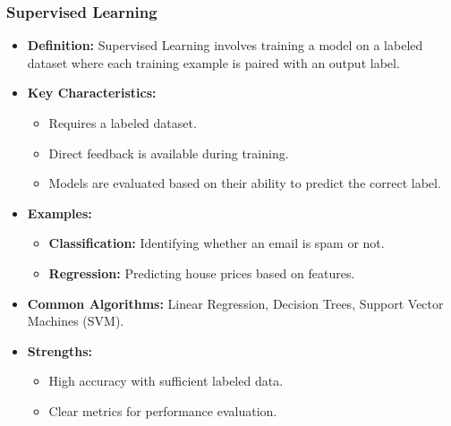 \documentclass[aspectratio=169]{beamer}
\begin{document}
\begin{frame}[fragile]
    \frametitle{Supervised Learning}
    \begin{itemize}
        \item \textbf{Definition:} 
        Supervised Learning involves training a model on a labeled dataset where each training example is paired with an output label.
        
        \item \textbf{Key Characteristics:}
        \begin{itemize}
            \item Requires a labeled dataset.
            \item Direct feedback is available during training.
            \item Models are evaluated based on their ability to predict the correct label.
        \end{itemize}
        
        \item \textbf{Examples:}
        \begin{itemize}
            \item \textbf{Classification:} Identifying whether an email is spam or not.
            \item \textbf{Regression:} Predicting house prices based on features.
        \end{itemize}
        
        \item \textbf{Common Algorithms:} Linear Regression, Decision Trees, Support Vector Machines (SVM).
        
        \item \textbf{Strengths:}
        \begin{itemize}
            \item High accuracy with sufficient labeled data.
            \item Clear metrics for performance evaluation.
        \end{itemize}
    \end{itemize}
\end{frame}
\end{document}
